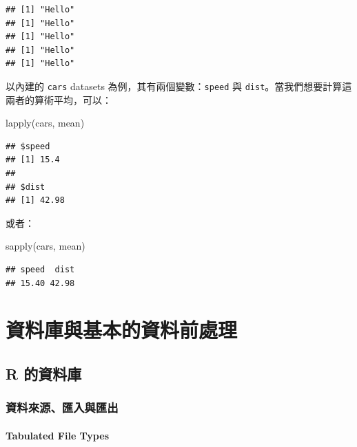 \documentclass[
]{book}
\newenvironment{Shaded}{\begin{snugshade}}{\end{snugshade}}
\newcommand{\FunctionTok}[1]{\textcolor[rgb]{0.00,0.00,0.00}{#1}}
\newcommand{\NormalTok}[1]{#1}
\theoremstyle{definition}
\theoremstyle{remark}
\begin{document}
\begin{verbatim}
## [1] "Hello"
## [1] "Hello"
## [1] "Hello"
## [1] "Hello"
## [1] "Hello"
\end{verbatim}

以內建的 \texttt{cars} datasets 為例，其有兩個變數：\texttt{speed} 與 \texttt{dist}。當我們想要計算這兩者的算術平均，可以：

\begin{Shaded}
\begin{Highlighting}[]
\FunctionTok{lapply}\NormalTok{(cars, mean)}
\end{Highlighting}
\end{Shaded}

\begin{verbatim}
## $speed
## [1] 15.4
## 
## $dist
## [1] 42.98
\end{verbatim}

或者：

\begin{Shaded}
\begin{Highlighting}[]
\FunctionTok{sapply}\NormalTok{(cars, mean)}
\end{Highlighting}
\end{Shaded}

\begin{verbatim}
## speed  dist 
## 15.40 42.98
\end{verbatim}

\hypertarget{part-ux8cc7ux6599ux5eabux8207ux57faux672cux7684ux8cc7ux6599ux524dux8655ux7406}{%
\part{資料庫與基本的資料前處理}\label{part-ux8cc7ux6599ux5eabux8207ux57faux672cux7684ux8cc7ux6599ux524dux8655ux7406}}

\hypertarget{rdata}{%
\chapter{R 的資料庫}\label{rdata}}

\hypertarget{ux8cc7ux6599ux4f86ux6e90ux532fux5165ux8207ux532fux51fa}{%
\section{資料來源、匯入與匯出}\label{ux8cc7ux6599ux4f86ux6e90ux532fux5165ux8207ux532fux51fa}}

\hypertarget{tabulated-file-types}{%
\subsection{Tabulated File Types}\label{tabulated-file-types}}
\end{document}
